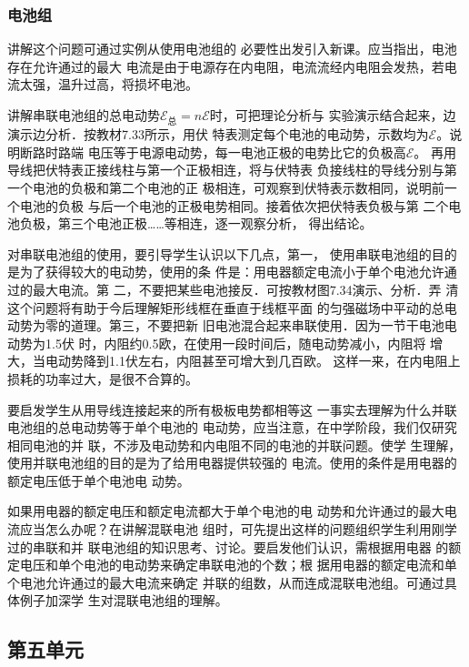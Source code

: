 \subsubsection{电池组}

讲解这个问题可通过实例从使用电池组的
必要性出发引入新课。应当指出，电池存在允许通过的最大
电流是由于电源存在内电阻，电流流经内电阻会发热，若电
流太强，温升过高，将损坏电池。

讲解串联电池组的总电动势$\mathcal{E}_{\text{总}}=n\mathcal{E}$时，可把理论分析与
实验演示结合起来，边演示边分析．按教材7.33所示，用伏
特表测定每个电池的电动势，示数均为$\mathcal{E}$。说明断路时路端
电压等于电源电动势，每一电池正极的电势比它的负极高$\mathcal{E}$。
再用导线把伏特表正接线柱与第一个正极相连，将与伏特表
负接线柱的导线分别与第一个电池的负极和第二个电池的正
极相连，可观察到伏特表示数相同，说明前一个电池的负极
与后一个电池的正极电势相同。接着依次把伏特表负极与第
二个电池负极，第三个电池正极……等相连，逐一观察分析，
得出结论。

对串联电池组的使用，要引导学生认识以下几点，第一，
使用串联电池组的目的是为了获得较大的电动势，使用的条
件是：用电器额定电流小于单个电池允许通过的最大电流。第
二，不要把某些电池接反．可按教材图7.34演示、分析．弄
清这个问题将有助于今后理解矩形线框在垂直于线框平面
的匀强磁场中平动的总电动势为零的道理。第三，不要把新
旧电池混合起来串联使用．因为一节干电池电动势为1.5伏
时，内阻约0.5欧，在使用一段时间后，随电动势减小，内阻将
增大，当电动势降到1.1伏左右，内阻甚至可增大到几百欧。
这样一来，在内电阻上损耗的功率过大，是很不合算的。

要启发学生从用导线连接起来的所有极板电势都相等这
一事实去理解为什么并联电池组的总电动势等于单个电池的
电动势，应当注意，在中学阶段，我们仅研究相同电池的并
联，不涉及电动势和内电阻不同的电池的并联问题。使学
生理解，使用并联电池组的目的是为了给用电器提供较强的
电流。使用的条件是用电器的额定电压低于单个电池电
动势。

如果用电器的额定电压和额定电流都大于单个电池的电
动势和允许通过的最大电流应当怎么办呢？在讲解混联电池
组时，可先提出这样的问题组织学生利用刚学过的串联和并
联电池组的知识思考、讨论。要启发他们认识，需根据用电器
的额定电压和单个电池的电动势来确定串联电池的个数；根
据用电器的额定电流和单个电池允许通过的最大电流来确定
并联的组数，从而连成混联电池组。可通过具体例子加深学
生对混联电池组的理解。

\subsection{第五单元}

